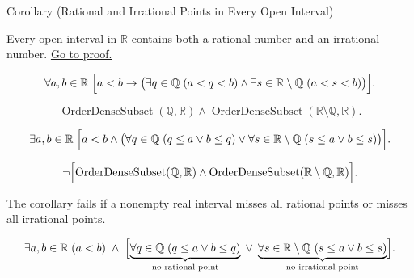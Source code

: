\begin{corollarybox}{Corollary (Rational and Irrational Points in Every Open Interval)}
\begin{corollary}
\label{cor:every-open-interval-contains-rational-and-irrational}
Every open interval in $\mathbb{R}$ contains both a rational number and an irrational number.
\hyperref[prf:every-open-interval-contains-rational-and-irrational]{Go to proof.}
\end{corollary}
\end{corollarybox}

\begin{remark*}
\[
\forall a,b\in\mathbb{R}\;
\Bigl[
a<b\rightarrow
\bigl(\exists q\in\mathbb{Q}\;(a<q<b)\land \exists s\in\mathbb{R}\setminus\mathbb{Q}\;(a<s<b)\bigr)
\Bigr].
\]
\end{remark*}

\begin{remark*}
\[
\operatorname{OrderDenseSubset}(\mathbb{Q},\mathbb{R})
\land
\operatorname{OrderDenseSubset}(\mathbb{R}\setminus\mathbb{Q},\mathbb{R}).
\]
\end{remark*}

\begin{remark*}
\[
\exists a,b\in\mathbb{R}\;
\Bigl[
a<b\land
\bigl(
\forall q\in\mathbb{Q}\;(q\le a\lor b\le q)
\lor
\forall s\in\mathbb{R}\setminus\mathbb{Q}\;(s\le a\lor b\le s)
\bigr)
\Bigr].
\]
\end{remark*}

\begin{remark*}
\[
\neg\Bigl[
\operatorname{OrderDenseSubset}(\mathbb{Q},\mathbb{R})
\land
\operatorname{OrderDenseSubset}(\mathbb{R}\setminus\mathbb{Q},\mathbb{R})
\Bigr].
\]
\end{remark*}

\begin{remark*}
The corollary fails if a nonempty real interval misses all rational points or misses all irrational points.
\end{remark*}

\begin{remark*}
\[
\exists a,b\in\mathbb{R}\;(a<b)
\;\land\;
\Bigl[
\underbrace{\forall q\in\mathbb{Q}\;(q\le a\lor b\le q)}_{\text{no rational point}}
\;\lor\;
\underbrace{\forall s\in\mathbb{R}\setminus\mathbb{Q}\;(s\le a\lor b\le s)}_{\text{no irrational point}}
\Bigr].
\]
\end{remark*}

